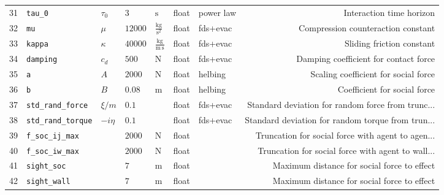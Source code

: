 \begin{table}[H]
\begin{tabularx}{1.0\linewidth}{rllllllR}
31 &                    \verb|tau_0| &       $\tau_{0}$ &                                 $3$ &                 $\mathrm{s}$ &       float &  power law &                           Interaction time horizon \\
32 &                       \verb|mu| &            $\mu$ &                             $12000$ &  $\mathrm{\frac{kg}{s^{2}}}$ &       float &   fds+evac &                 Compression counteraction constant \\
33 &                    \verb|kappa| &         $\kappa$ &                             $40000$ &   $\mathrm{\frac{kg}{m\,s}}$ &       float &   fds+evac &                          Sliding friction constant \\
34 &                  \verb|damping| &          $c_{d}$ &                               $500$ &                 $\mathrm{N}$ &       float &   fds+evac &              Damping coefficient for contact force \\
35 &                        \verb|a| &              $A$ &                              $2000$ &                 $\mathrm{N}$ &       float &    helbing &               Scaling coefficient for social force \\
36 &                        \verb|b| &              $B$ &                              $0.08$ &                 $\mathrm{m}$ &       float &    helbing &                       Coefficient for social force \\
37 &           \verb|std_rand_force| &        $\xi / m$ &                               $0.1$ &                              &       float &   fds+evac &  Standard deviation for random force from trunc... \\
38 &          \verb|std_rand_torque| &       $- i \eta$ &                               $0.1$ &                              &       float &   fds+evac &  Standard deviation for random torque from trun... \\
39 &             \verb|f_soc_ij_max| &                  &                              $2000$ &                 $\mathrm{N}$ &       float &            &  Truncation for social force with agent to agen... \\
40 &             \verb|f_soc_iw_max| &                  &                              $2000$ &                 $\mathrm{N}$ &       float &            &  Truncation for social force with agent to wall... \\
41 &                \verb|sight_soc| &                  &                                 $7$ &                 $\mathrm{m}$ &       float &            &        Maximum distance for social force to effect \\
42 &               \verb|sight_wall| &                  &                                 $7$ &                 $\mathrm{m}$ &       float &            &        Maximum distance for social force to effect \\
\end{tabularx} 
\end{table}

